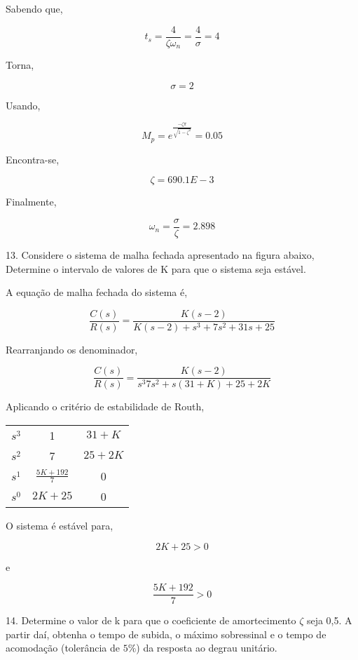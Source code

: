 \documentclass[paper=a4, fontsize=11pt]{article}
\begin{document}
Sabendo que,

$$
t_s = \frac{4}{\zeta \omega_n} = \frac{4}{\sigma} = 4
$$

Torna,

$$
\sigma = 2
$$

Usando,

$$
M_p = e^{\frac{-\zeta \pi}{\sqrt{1-\zeta^2}} } = 0.05
$$

Encontra-se,

$$
\zeta = 690.1E-3
$$

Finalmente,

$$
\omega_n = \frac{\sigma}{\zeta} = 2.898
$$

\newpage

13. Considere o sistema de malha fechada apresentado na figura abaixo,
Determine o intervalo de valores de K para que o sistema seja estável.

A equação de malha fechada do sistema é,

$$
\frac{C(s)}{R(s)} = \frac{K (s-2)}{K (s-2) + s^3 + 7 s^2 + 31 s + 25}
$$

Rearranjando os denominador,

$$
\frac{C(s)}{R(s)} = \frac{K (s-2)}{s^3 7 s^2 + s(31 + K) + 25 + 2K} 
$$

Aplicando o critério de estabilidade de Routh,

\begin{center}
    \begin{tabular}{c| c c}
        $s^3$ & 1 & $31+K$ \\
        $s^2$ & 7 & $25+2K$ \\
        $s^1$ & $\frac{5K+192}{7}$ & 0 \\
        $s^0$ & $2K+25$ & 0 \\
    \end{tabular}
\end{center}

O sistema é estável para,

$$
2 K + 25 > 0
$$

e 

$$
\frac{5K+192}{7} > 0
$$

\newpage

14. Determine o valor de k para que o coeficiente de amortecimento $\zeta $ seja 0,5. 
A partir daí, obtenha o tempo de subida, o máximo sobressinal e o tempo de acomodação 
(tolerância de $5\%$) da resposta ao degrau unitário.
\end{document}

